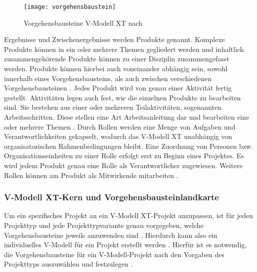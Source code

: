 \begin{figure}[htp]
\begin{center}
  \texttt{[image: vorgehensbaustein]} %
  \caption{Vorgehensbausteine V-Modell XT nach \cite{2004vmodell}}
  \label{fig:vorgehensbausteine}
\end{center}
\end{figure}

Ergebnisse und Zwischenergebnisse werden Produkte genannt. Komplexe Produkte können in ein oder mehrere Themen gegliedert werden und inhaltlich zusammengehörende Produkte können zu einer Disziplin zusammengefasst werden. Produkte können hierbei auch voneinander abhängig sein, sowohl innerhalb eines Vorgehensbausteins, als auch zwischen verschiedenen Vorgehensbausteinen \cite{2004vmodell}.\newline
Jedes Produkt wird von genau einer Aktivität fertig gestellt. Aktivitäten legen auch fest, wie die einzelnen Produkte zu bearbeiten sind. Sie bestehen aus einer oder mehreren Teilaktivitäten, sogenannten Arbeitsschritten. Diese stellen eine Art Arbeitsanleitung dar und bearbeiten eine oder mehrere Themen \cite{2004vmodell}.\newline
Durch Rollen werden eine Menge von Aufgaben und Verantwortlichkeiten gekapselt, wodurch das V-Modell XT unabhängig von organisatorischen Rahmenbedingungen bleibt. Eine Zuordnung von Personen bzw. Organisationseinheiten zu einer Rolle erfolgt erst zu Beginn eines Projektes. Es wird jedem Produkt genau eine Rolle als Verantwortlicher zugewiesen. Weitere Rollen können am Produkt als Mitwirkende mitarbeiten \cite{2004vmodell}. \newline



\subsubsection{V-Modell XT-Kern und Vorgehensbausteinlandkarte}

Um ein spezifisches Projekt an ein V-Modell XT-Projekt anzupassen, ist für jeden Projekttyp und jede Projekttypvariante genau vorgegeben, welche Vorgehensbausteine jeweils anzuwenden sind \cite{2004vmodell}. Hierdurch kann also ein individuelles V-Modell für ein Projekt erstellt werden \cite{heinrich2007}. Hierfür ist es notwendig, die Vorgehensbausteine für ein V-Modell-Projekt nach den Vorgaben des Projekttyps auszuwählen und festzulegen \cite{2004vmodell}. \newline

